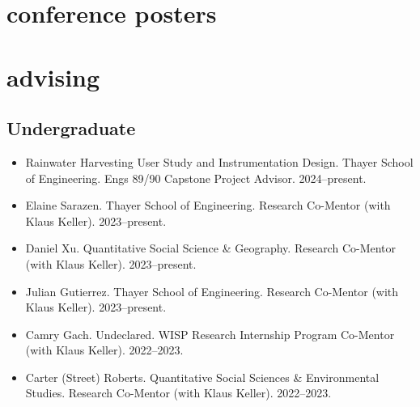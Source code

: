 \documentclass[10pt,oneside]{article}
\begin{document}
\mbox{}\vspace{-\dimexpr\baselineskip\relax}
\vspace*{-1em}
\printbibliography[type=inproceedings, keyword={presentation}, heading=none]

\section{conference posters}

\mbox{}\vspace{-\dimexpr\baselineskip\relax}
\vspace*{-1em}
\printbibliography[type=inproceedings, keyword={poster}, heading=none]


\section{advising}

\mbox{}\vspace{-\dimexpr\baselineskip\relax}



\subsection{Undergraduate}
\begin{itemize}[label={}]

\item Rainwater Harvesting User Study and Instrumentation Design. Thayer School of Engineering. Engs 89/90 Capstone Project Advisor. 2024--present.  

\item Elaine Sarazen. Thayer School of Engineering. Research Co-Mentor (with Klaus Keller). 2023--present.  

\item Daniel Xu. Quantitative Social Science \& Geography. Research Co-Mentor (with Klaus Keller). 2023--present.  

\item Julian Gutierrez. Thayer School of Engineering. Research Co-Mentor (with Klaus Keller). 2023--present.  

\item Camry Gach. Undeclared. WISP Research Internship Program Co-Mentor (with Klaus Keller). 2022--2023.  

\item Carter (Street) Roberts. Quantitative Social Sciences \& Environmental Studies. Research Co-Mentor (with Klaus Keller). 2022--2023.  

\end{itemize}
\end{document}
